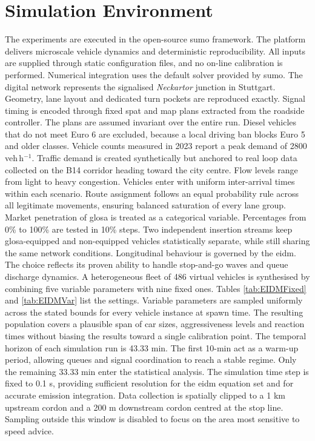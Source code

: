 \section{Simulation Environment}
\label{sec:SimEnvironment}
The experiments are executed in the open-source \ac{sumo} framework. The platform delivers microscale vehicle dynamics and deterministic reproducibility. All inputs are supplied through static configuration files, and no on-line calibration is performed. Numerical integration uses the default solver provided by \ac{sumo}.
\mynewline
The digital network represents the signalised \emph{Neckartor} junction in Stuttgart. Geometry, lane layout and dedicated turn pockets are reproduced exactly. Signal timing is encoded through fixed \gls{spat} and \gls{map} plans extracted from the roadside controller. The plans are assumed invariant over the entire run. Diesel vehicles that do not meet Euro 6 are excluded, because a local driving ban blocks Euro 5 and older classes. Vehicle counts measured in 2023 report a peak demand of 2800\,veh\,h\(^{-1}\).
\mynewline
Traffic demand is created synthetically but anchored to real loop data collected on the B14 corridor heading toward the city centre. Flow levels range from light to heavy congestion. Vehicles enter with uniform inter-arrival times within each scenario. Route assignment follows an equal probability rule across all legitimate movements, ensuring balanced saturation of every lane group. Market penetration of \ac{glosa} is treated as a categorical variable. Percentages from 0\% to 100\% are tested in 10\% steps. Two independent insertion streams keep \ac{glosa}-equipped and non-equipped vehicles statistically separate, while still sharing the same network conditions.
\mynewline
Longitudinal behaviour is governed by the \ac{eidm}. The choice reflects its proven ability to handle stop-and-go waves and queue discharge dynamics.  A heterogeneous fleet of 486 virtual vehicles is synthesised by combining five variable parameters with nine fixed ones. Tables \ref{tab:EIDMFixed} and \ref{tab:EIDMVar} list the settings. Variable parameters are sampled uniformly across the stated bounds for every vehicle instance at spawn time. The resulting population covers a plausible span of car sizes, aggressiveness levels and reaction times without biasing the results toward a single calibration point.
\mynewline
The temporal horizon of each simulation run is 43.33 min. The first 10-min act as a warm-up period, allowing queues and signal coordination to reach a stable regime. Only the remaining 33.33 min enter the statistical analysis. The simulation time step is fixed to 0.1 s, providing sufficient resolution for the \ac{eidm} equation set and for accurate emission integration. Data collection is spatially clipped to a 1 km upstream cordon and a 200 m downstream cordon centred at the stop line. Sampling outside this window is disabled to focus on the area most sensitive to speed advice.
